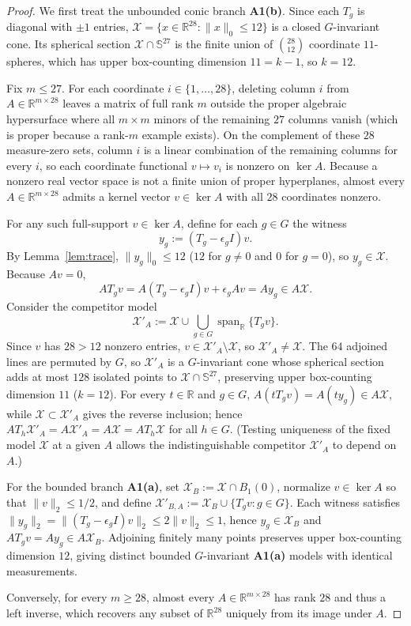 \documentclass[11pt]{article}
\theoremstyle{plain}
\theoremstyle{definition}
\theoremstyle{remark}
\DeclareMathOperator{\spn}{span}
\begin{document}
\begin{proof}
We first treat the unbounded conic branch \textbf{A1(b)}.
Since each $T_g$ is diagonal with $\pm 1$ entries, $\mathcal{X} = \{x \in \mathbb{R}^{28} : \|x\|_0 \le 12\}$ is a closed $G$-invariant cone.
Its spherical section $\mathcal{X} \cap \mathbb{S}^{27}$ is the finite union of $\binom{28}{12}$ coordinate $11$-spheres, which has upper box-counting dimension $11 = k - 1$, so $k = 12$.

Fix $m \le 27$.
For each coordinate $i \in \{1, \dots, 28\}$, deleting column $i$ from $A \in \mathbb{R}^{m \times 28}$ leaves a matrix of full rank $m$ outside the proper algebraic hypersurface where all $m \times m$ minors of the remaining $27$ columns vanish (which is proper because a rank-$m$ example exists).
On the complement of these $28$ measure-zero sets, column $i$ is a linear combination of the remaining columns for every $i$, so each coordinate functional $v \mapsto v_i$ is nonzero on $\ker A$.
Because a nonzero real vector space is not a finite union of proper hyperplanes, almost every $A \in \mathbb{R}^{m \times 28}$ admits a kernel vector $v \in \ker A$ with all $28$ coordinates nonzero.

For any such full-support $v \in \ker A$, define for each $g \in G$ the witness
\[
y_g := (T_g - \epsilon_g I) v.
\]
By Lemma~\ref{lem:trace}, $\|y_g\|_0 \le 12$ ($12$ for $g \neq 0$ and $0$ for $g = 0$), so $y_g \in \mathcal{X}$.
Because $Av = 0$,
\[
A T_g v = A(T_g - \epsilon_g I) v + \epsilon_g A v = A y_g \in A\mathcal{X}.
\]
Consider the competitor model
\[
\mathcal{X}'_A := \mathcal{X} \cup \bigcup_{g \in G} \spn_{\mathbb{R}}\{T_g v\}.
\]
Since $v$ has $28 > 12$ nonzero entries, $v \in \mathcal{X}'_A \setminus \mathcal{X}$, so $\mathcal{X}'_A \neq \mathcal{X}$.
The $64$ adjoined lines are permuted by $G$, so $\mathcal{X}'_A$ is a $G$-invariant cone whose spherical section adds at most $128$ isolated points to $\mathcal{X} \cap \mathbb{S}^{27}$, preserving upper box-counting dimension $11$ ($k = 12$).
For every $t \in \mathbb{R}$ and $g \in G$, $A(t T_g v) = A(t y_g) \in A\mathcal{X}$, while $\mathcal{X} \subset \mathcal{X}'_A$ gives the reverse inclusion; hence $A T_h \mathcal{X}'_A = A\mathcal{X}'_A = A\mathcal{X} = A T_h \mathcal{X}$ for all $h \in G$.
(Testing uniqueness of the fixed model $\mathcal{X}$ at a given $A$ allows the indistinguishable competitor $\mathcal{X}'_A$ to depend on $A$.)

For the bounded branch \textbf{A1(a)}, set $\mathcal{X}_B := \mathcal{X} \cap B_1(0)$, normalize $v \in \ker A$ so that $\|v\|_2 \le 1/2$, and define $\mathcal{X}'_{B,A} := \mathcal{X}_B \cup \{T_g v : g \in G\}$.
Each witness satisfies $\|y_g\|_2 = \|(T_g - \epsilon_g I)v\|_2 \le 2\|v\|_2 \le 1$, hence $y_g \in \mathcal{X}_B$ and $A T_g v = A y_g \in A\mathcal{X}_B$.
Adjoining finitely many points preserves upper box-counting dimension $12$, giving distinct bounded $G$-invariant \textbf{A1(a)} models with identical measurements.

Conversely, for every $m \ge 28$, almost every $A \in \mathbb{R}^{m \times 28}$ has rank $28$ and thus a left inverse, which recovers any subset of $\mathbb{R}^{28}$ uniquely from its image under $A$.
\end{proof}
\end{document}
